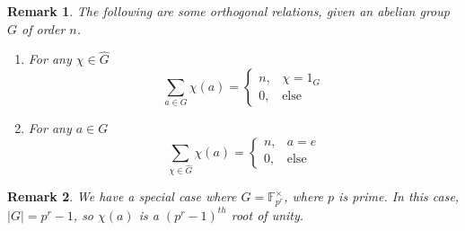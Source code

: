 \documentclass{article}
\newtheorem{remark}{Remark}[subsection]
\begin{document}
\begin{remark}
The following are some orthogonal relations, given an abelian group $G$ of order $n$.
\begin{enumerate}
    \item For any $\chi\in\widehat{G}$
    \begin{equation*}
        \sum_{a\in G}\chi(a)=
        \begin{cases}
        n, &\chi=1_G\\
        0, &\text{else}
        \end{cases}
    \end{equation*}
    \item For any $a\in G$
    \begin{equation*}
        \sum_{\chi\in \widehat{G}}\chi(a)=
        \begin{cases}
        n, &a=e\\
        0, &\text{else}
        \end{cases}
    \end{equation*}
\end{enumerate}
\end{remark}
\begin{remark}
We have a special case where $G=\mathbb{F}_{p^r}^\times$, where $p$ is prime. In this case, $|G|=p^r-1$, so $\chi(a)$ is a $(p^r-1)^{th}$ root of unity.
\end{remark}
\newpage
\end{document}
